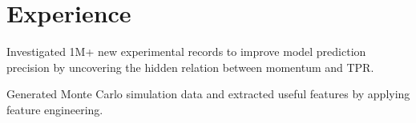 \documentclass[letterpaper]{deedy-resume-openfont}
\begin{document}

\section{Experience}

\begin{tightemize}
\item Investigated 1M+ new experimental records to improve model prediction precision by uncovering the hidden relation between momentum and TPR.
\item Generated Monte Carlo simulation data and extracted useful features by applying feature engineering.
\end{tightemize}
\sectionsep
\end{document}
